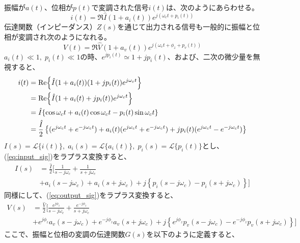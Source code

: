 \documentclass[book]{jlreq}
\begin{document}
振幅が$a(t)$、位相が$p(t)$で変調された信号$i(t)$は、次のようにあらわせる\cite{Pedersen}。
%
\begin{equation}
    i(t) = \Re{\hat{I}(1 + a_i(t))e^{j(\omega_c t + p_i (t))}}
    \label{eq:input_sig}
\end{equation}
%
伝達関数（インピーダンス）$Z(s)$を通じて出力される信号も一般的に振幅と位相が変調され次のようになれる。
%
\begin{equation}
    V(t) = \Re{\hat{V}(1 + a_v(t))e^{j(\omega_c t + \phi_z + p_v (t))}}
    \label{eq:output_sig}
\end{equation}
%
$a_i(t) \ll 1,\; p_i(t) \ll 1$の時、$e^{j p_i (t)} \simeq 1+j p_i(t)$、および、二次の微少量を無視すると、
%
\begin{align}
    i(t) &=\Re{\hat{I}(1 + a_i(t))(1 + j p_i (t))e^{j\omega_c t}} \notag \\ 
        &=\Re{\hat{I}(1 + a_i(t)+ j p_i (t))e^{j\omega_c t}} \notag \\ 
        &= \hat{I}\{\cos\omega_c t + a_i(t)\cos\omega_c t - p_i(t)\sin\omega_c t\} \notag \\
        &= \frac{\hat{I}}{2}\left \{(e^{j\omega_c t}+e^{-j\omega_c t})+a_i(t)(e^{j\omega_c t} 
        + e^{-j\omega_c t})+ j p_i(t)(e^{j\omega_c t}-e^{-j\omega_c t})\right \}
        \label{eq:input_sig2}
\end{align}
%
$I(s)=\mathcal{L}\{i(t)\},\; a_i(s) = \mathcal{L}\{a_i(t)\},\; p_i(s) = \mathcal{L}\{p_i(t)\}$とし、(\ref{eq:input_sig})をラプラス変換すると、
%
\begin{equation}
    \begin{split}
        I(s) &= \frac{\hat{I}}{2}\biggl [\frac{1}{s-j\omega_c}+\frac{1}{s+j\omega_c} \\
        &+ a_i(s - j\omega_c)+a_i(s+j\omega_c) 
        + j\left \{p_i(s-j\omega_c)-p_i(s+j\omega_c) \right \} \biggr ]
    \label{eq:lt_input}
    \end{split}
\end{equation}
%
同様にして、(\ref{eq:output_sig})をラプラス変換すると、
%
\begin{equation}
    \begin{split}
        V(s) &= \frac{\hat{V}}{2}\biggr [\frac{e^{j\phi_z}}{s-j\omega_c}+\frac{e^{-j\phi_z}}{s+j\omega_c} \\
        &+ e^{j\phi_z}a_v(s - j\omega_c) + e^{-j\phi_z}a_v(s+j\omega_c)
        + j\left \{e^{j\phi_z}p_v(s-j\omega_c) - e^{-j\phi_z}p_v(s+j\omega_c) \right \} \biggl ]
    \label{eq:lt_output}
    \end{split}
\end{equation}
%
ここで、振幅と位相の変調の伝達関数$G(s)$を以下のように定義すると、
\end{document}
